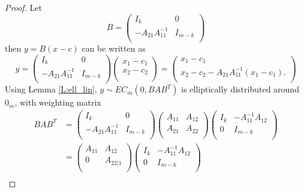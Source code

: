 \begin{proof}
Let
\[
  B=
  \begin{pmatrix}
    I_k                 & 0       \\
    -A_{21} A_{11}^{-1} & I_{m-k} \\
  \end{pmatrix}
\]
then $y=B(x-c)$ can be written as
\[
  y=
  \begin{pmatrix}
    I_k                 & 0       \\
    -A_{21} A_{11}^{-1} & I_{m-k} \\
  \end{pmatrix}
  \begin{pmatrix}
    x_1-c_1 \\
    x_2-c_2 \\
  \end{pmatrix}
  = 
  \begin{pmatrix}
    x_1-c_1 \\
    x_2-c_2-A_{21}A_{11}^{-1}(x_1-c_1). \\
  \end{pmatrix}
\]
Using Lemma \ref{L:ell_lin}, $y\sim EC_m(0,BAB^T)$ is elliptically distributed 
around $0_m$, with weighting matrix
\begin{align*}
  BAB^T 
  &=
    \begin{pmatrix}
      I_k                 & 0       \\
      -A_{21} A_{11}^{-1} & I_{m-k} \\
    \end{pmatrix}
    \begin{pmatrix}
      A_{11} & A_{12}\\
      A_{21} & A_{22}\\
    \end{pmatrix}
    \begin{pmatrix}
      I_k  & - A_{11}^{-1} A_{12}  \\
      0    & I_{m-k} \\
    \end{pmatrix} \\
  &=
    \begin{pmatrix}
      A_{11} & A_{12}\\
      0      & A_{22|1}\\
    \end{pmatrix}
    \begin{pmatrix}
      I_k  & - A_{11}^{-1} A_{12}  \\
      0    & I_{m-k} \\
    \end{pmatrix} \\

\end{align*}
\end{proof}
